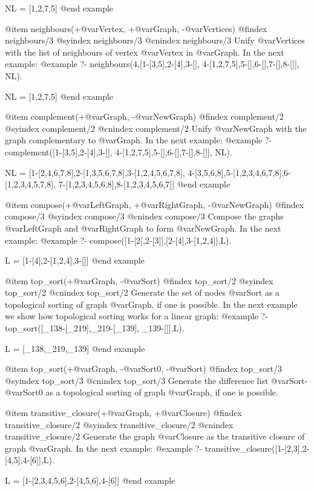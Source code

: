 {{{{{{{{{NL = [1,2,7,5]
@end example

@item neighbours(+@var{Vertex}, +@var{Graph}, -@var{Vertices})
@findex  neighbours/3
@syindex neighbours/3
@cnindex neighbours/3
Unify @var{Vertices} with the list of neighbours of vertex @var{Vertex}
in @var{Graph}. In the next example:
@example
?- neighbours(4,[1-[3,5],2-[4],3-[],
                 4-[1,2,7,5],5-[],6-[],7-[],8-[]], NL).

NL = [1,2,7,5]
@end example

@item complement(+@var{Graph}, -@var{NewGraph})
@findex  complement/2
@syindex complement/2
@cnindex complement/2
Unify @var{NewGraph} with the graph complementary to @var{Graph}.
 In the next example:
@example
?- complement([1-[3,5],2-[4],3-[],
               4-[1,2,7,5],5-[],6-[],7-[],8-[]], NL).

NL = [1-[2,4,6,7,8],2-[1,3,5,6,7,8],3-[1,2,4,5,6,7,8],
      4-[3,5,6,8],5-[1,2,3,4,6,7,8],6-[1,2,3,4,5,7,8],
      7-[1,2,3,4,5,6,8],8-[1,2,3,4,5,6,7]]
@end example

@item compose(+@var{LeftGraph}, +@var{RightGraph}, -@var{NewGraph})
@findex  compose/3
@syindex compose/3
@cnindex compose/3
Compose the graphs @var{LeftGraph} and @var{RightGraph} to form @var{NewGraph}.
 In the next example:
@example
?- compose([1-[2],2-[3]],[2-[4],3-[1,2,4]],L).

L = [1-[4],2-[1,2,4],3-[]]
@end example

@item top_sort(+@var{Graph}, -@var{Sort})
@findex  top_sort/2
@syindex top_sort/2
@cnindex top_sort/2
Generate the set of nodes @var{Sort} as a topological sorting of graph
@var{Graph}, if one is possible.
 In the next example we show how topological sorting works for a linear graph:
@example
?- top_sort([_138-[_219],_219-[_139], _139-[]],L).

L = [_138,_219,_139]
@end example

@item top_sort(+@var{Graph}, -@var{Sort0}, -@var{Sort})
@findex  top_sort/3
@syindex top_sort/3
@cnindex top_sort/3
Generate the difference list @var{Sort}-@var{Sort0} as a topological
sorting of graph @var{Graph}, if one is possible.

@item transitive_closure(+@var{Graph}, +@var{Closure})
@findex  transitive_closure/2
@syindex transitive_closure/2
@cnindex transitive_closure/2
Generate the graph @var{Closure} as the transitive closure of graph
@var{Graph}.
 In the next example:
@example
?- transitive_closure([1-[2,3],2-[4,5],4-[6]],L).

L = [1-[2,3,4,5,6],2-[4,5,6],4-[6]]
@end example

}}}}}}}}}
